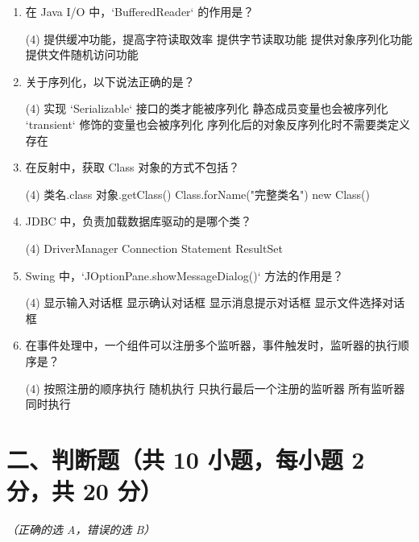 \documentclass[a3paper, landscape, 11pt, twocolumn]{article}
\begin{document}
\begin{enumerate}[label=\arabic*., itemsep=0.8em]
	\item 在 Java I/O 中，`BufferedReader` 的作用是？
	      \begin{tasks}(4)
		      \task 提供缓冲功能，提高字符读取效率
		      \task 提供字节读取功能
		      \task 提供对象序列化功能
		      \task 提供文件随机访问功能
	      \end{tasks}

	\item 关于序列化，以下说法正确的是？
	      \begin{tasks}(4)
		      \task 实现 `Serializable` 接口的类才能被序列化
		      \task 静态成员变量也会被序列化
		      \task `transient` 修饰的变量也会被序列化
		      \task 序列化后的对象反序列化时不需要类定义存在
	      \end{tasks}

	\item 在反射中，获取 Class 对象的方式不包括？
	      \begin{tasks}(4)
		      \task 类名.class
		      \task 对象.getClass()
		      \task Class.forName("完整类名")
		      \task new Class()
	      \end{tasks}

	\item JDBC 中，负责加载数据库驱动的是哪个类？
	      \begin{tasks}(4)
		      \task DriverManager \task Connection \task Statement \task ResultSet
	      \end{tasks}

	\item Swing 中，`JOptionPane.showMessageDialog()` 方法的作用是？
	      \begin{tasks}(4)
		      \task 显示输入对话框
		      \task 显示确认对话框
		      \task 显示消息提示对话框
		      \task 显示文件选择对话框
	      \end{tasks}

	\item 在事件处理中，一个组件可以注册多个监听器，事件触发时，监听器的执行顺序是？
	      \begin{tasks}(4)
		      \task 按照注册的顺序执行
		      \task 随机执行
		      \task 只执行最后一个注册的监听器
		      \task 所有监听器同时执行
	      \end{tasks}
\end{enumerate}

\vspace{0.5cm}

\section*{二、判断题（共 10 小题，每小题 2 分，共 20 分）}
\textit{（正确的选 A，错误的选 B）}
\end{document}
